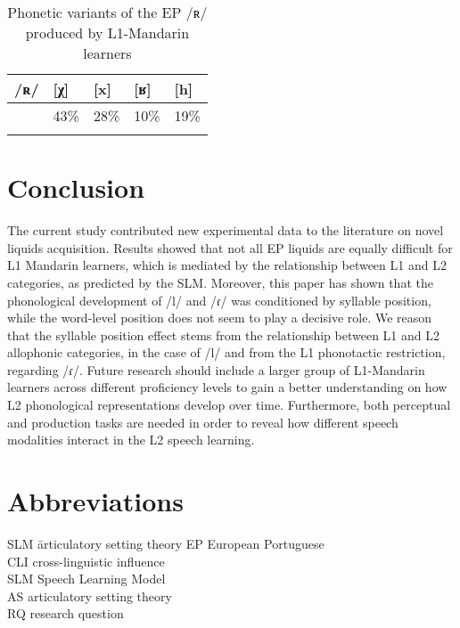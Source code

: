 \documentclass[output=paper]{../langscibook}
\begin{document}
\begin{table}
\begin{tabularx}{.8\textwidth}{XXXXl}
\lsptoprule
 /ʀ/ &  [χ] &  [x] &  [ʁ] &  [h]\\\midrule
     & 43\% & 28\% & 10\% & 19\%\\
\lspbottomrule
\end{tabularx}
\caption{Phonetic variants of the EP /ʀ/ produced by L1-Mandarin learners}\label{tab:zhou:2}
\end{table}


\section{Conclusion}
\label{sec:zhou:6}

The current study contributed new experimental data to the literature on novel liquids acquisition. Results showed that not all EP liquids are equally difficult for L1 Mandarin learners, which is mediated by the relationship between L1 and L2 categories, as predicted by the SLM. Moreover, this paper has shown that the phonological development of /l/ and /ɾ/ was conditioned by syllable position, while the word-level position does not seem to play a decisive role. We reason that the syllable position effect stems from the relationship between L1 and L2 allophonic categories, in the case of /l/ and from the L1 phonotactic restriction, regarding /ɾ/. Future research should include a larger group of L1-Mandarin learners across different proficiency levels to gain a better understanding on how L2 phonological representations develop over time. Furthermore, both perceptual and production tasks are needed in order to reveal how different speech modalities interact in the L2 speech learning.

\section*{Abbreviations}

\begin{multicols}{2}
\begin{tabbing}
SLM \= articulatory setting theory\kill
EP  \> European Portuguese\\
CLI \> cross-linguistic influence\\
SLM \> Speech Learning Model\\
AS  \> articulatory setting theory\\
RQ  \> research question
\end{tabbing}
\end{multicols}

\sloppy\printbibliography[heading=subbibliography,notkeyword=this]
\end{document}
